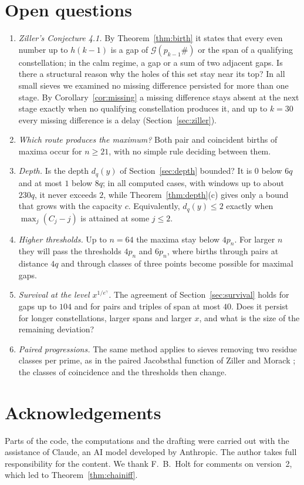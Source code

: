 \documentclass[11pt]{article}
\theoremstyle{definition}
\theoremstyle{remark}
\newcommand{\G}{\mathcal{G}}
\begin{document}
\section{Open questions}\label{sec:open}

\begin{enumerate}
\item \emph{Ziller's Conjecture 4.1.} By Theorem~\ref{thm:birth} it states that every even number up to $h(k-1)$ is a gap of $\G(p_{k-1}\#)$ or the span of a qualifying constellation; in the calm regime, a gap or a sum of two adjacent gaps. Is there a structural reason why the holes of this set stay near its top? In all small sieves we examined no missing difference persisted for more than one stage. By Corollary~\ref{cor:missing} a missing difference stays absent at the next stage exactly when no qualifying constellation produces it, and up to $k = 30$ every missing difference is a delay (Section~\ref{sec:ziller}).
\item \emph{Which route produces the maximum?} Both pair and coincident births of maxima occur for $n \ge 21$, with no simple rule deciding between them.
\item \emph{Depth.} Is the depth $d_q(y)$ of Section~\ref{sec:depth} bounded? It is $0$ below $6q$ and at most $1$ below $8q$; in all computed cases, with windows up to about $230q$, it never exceeds $2$, while Theorem~\ref{thm:depth}(c) gives only a bound that grows with the capacity $c$. Equivalently, $d_q(y) \le 2$ exactly when $\max_j (C_j - j)$ is attained at some $j \le 2$.
\item \emph{Higher thresholds.} Up to $n = 64$ the maxima stay below $4p_n$. For larger $n$ they will pass the thresholds $4p_n$ and $6p_n$, where births through pairs at distance $4q$ and through classes of three points become possible for maximal gaps.
\item \emph{Survival at the level $x^{1/e^\gamma}$.} The agreement of Section~\ref{sec:survival} holds for gaps up to $104$ and for pairs and triples of span at most $40$. Does it persist for longer constellations, larger spans and larger $x$, and what is the size of the remaining deviation?
\item \emph{Paired progressions.} The same method applies to sieves removing two residue classes per prime, as in the paired Jacobsthal function of Ziller and Morack \cite{ZM17}; the classes of coincidence and the thresholds then change.
\end{enumerate}

\section*{Acknowledgements}
Parts of the code, the computations and the drafting were carried out with the assistance of Claude, an AI model developed by Anthropic. The author takes full responsibility for the content. We thank F.~B.~Holt for comments on version~2, which led to Theorem~\ref{thm:chainiff}.
\end{document}
